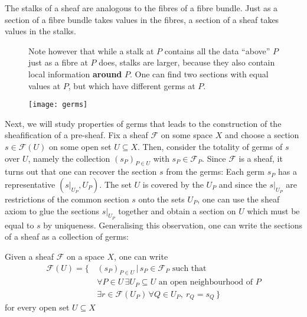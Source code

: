 The stalks of a sheaf are analogous to the fibres of a fibre bundle.
Just as a section of a fibre bundle takes values in the fibres, a section of
a sheaf takes values in the stalks.
\begin{lwarn}
  \begin{figure}[H]
    \begin{minipage}[t]{.5\textwidth}
      \vspace{0pt}
      Note however that while a stalk at $P$ contains all the data ``above''
      $P$ just as a fibre at $P$ does, stalks are larger, because they also
      contain local information \textbf{around} $P$. One can find two
      sections with equal values at $P$, but which have different germs at
      $P$.
    \end{minipage}%
    \begin{minipage}[t]{.45\textwidth}
      \centering
      \vspace{0pt}
      \texttt{[image: germs]}
    \end{minipage}
  \end{figure}
\end{lwarn}
Next, we will study properties of germs that leads to the
construction of the sheafification of a pre-sheaf.
Fix a sheaf $\mathscr{F}$ on some space $X$ and choose a section
$s\in \mathscr{F}(U)$ on some open set $U\subseteq X$. Then, consider
the totality of germs of $s$ over $U$, namely the collection
$(s_{P})_{P\in U}$ with $s_{P}\in\mathscr{F}_{P}$. Since $\mathscr{F}$ is a
sheaf, it turns out that one can recover the section $s$ from the
germs: Each germ $s_{P}$ has a representative $(s\vert_{U_{P}}, U_{P})$.
The set $U$ is covered by the $U_{P}$ and since the $s\vert_{U_{P}}$ are
restrictions of the common section $s$ onto the sets $U_{P}$, one can use the
sheaf axiom to glue the sections $s\vert_{U_{P}}$ together and obtain a
section on $U$ which must be equal to $s$ by uniqueness. Generalising this
observation, one can write the sections of a sheaf as a collection of germs:
\begin{lemm}\label{lemm:sheafify_sheaf}
  Given a sheaf $\mathscr{F}$ on a space $X$, one can write
  \begin{align*}
    \mathscr{F}(U)=\big\{\,
    & (s_{P})_{P\in U}\,\big\vert\, s_{P}\in\mathscr{F}_{P}\text{ such that} \\
    & \forall P\in U\,
      \exists U_{P}\subseteq U\text{ an open neighbourhood of }P \\
    & \exists r\in\mathscr{F}(U_{P})\,\forall Q\in U_{P},\ r_{Q}=s_{Q}\,\big\}
  \end{align*}
  for every open set $U\subseteq X$
\end{lemm}
